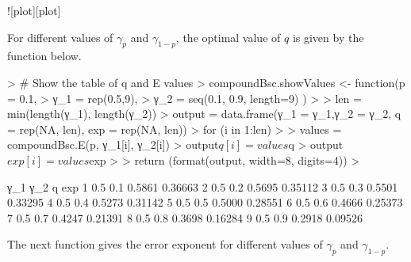 ![plot][plot]



For different values of $γ_p$ and $γ_{1-p}$, the optimal value of $q$ is given
by the function below.

\begin{Schunk}
\begin{Sinput}
> # Show the table of q and E values
> compoundBsc.showValues <- function(p = 0.1,
>                                    γ_1 = rep(0.5,9), 
>                                    γ_2 = seq(0.1, 0.9, length=9) )
> {
>   len    = min(length(γ_1), length(γ_2))
>   output = data.frame(γ_1 = γ_1,γ_2 = γ_2,  q = rep(NA, len), exp = rep(NA, len))
>   for (i in 1:len)
>   {
>     values        = compoundBsc.E(p, γ_1[i], γ_2[i])
>     output$q[i]   = values$q 
>     output$exp[i] = values$exp
>   }
>   return (format(output, width=8, digits=4))
> }
\end{Sinput}
\end{Schunk}

\begin{Schunk}
\begin{Soutput}
       γ_1      γ_2        q      exp
1      0.5      0.1   0.5861  0.36663
2      0.5      0.2   0.5695  0.35112
3      0.5      0.3   0.5501  0.33295
4      0.5      0.4   0.5273  0.31142
5      0.5      0.5   0.5000  0.28551
6      0.5      0.6   0.4666  0.25373
7      0.5      0.7   0.4247  0.21391
8      0.5      0.8   0.3698  0.16284
9      0.5      0.9   0.2918  0.09526
\end{Soutput}
\end{Schunk}

The next function gives the error exponent for different values of 
$γ_p$ and $γ_{1-p}$.


